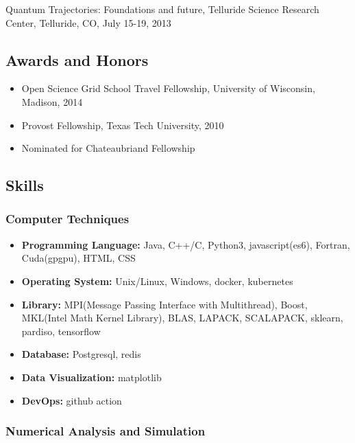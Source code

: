 \documentclass[
]{article}
\providecommand{\tightlist}{%
  \setlength{\itemsep}{0pt}\setlength{\parskip}{0pt}}
\begin{document}
Quantum Trajectories: Foundations and future, Telluride Science Research
Center, Telluride, CO, July 15-19, 2013

\hypertarget{awards-and-honors}{%
\subsection{Awards and Honors}\label{awards-and-honors}}

\begin{itemize}
\tightlist
\item
  Open Science Grid School Travel Fellowship, University of Wisconsin,
  Madison, 2014
\item
  Provost Fellowship, Texas Tech University, 2010
\item
  Nominated for Chateaubriand Fellowship
\end{itemize}

\hypertarget{skills}{%
\subsection{Skills}\label{skills}}

\hypertarget{computer-techniques}{%
\subsubsection{Computer Techniques}\label{computer-techniques}}

\begin{itemize}
\tightlist
\item
  \textbf{Programming Language:} Java, C++/C, Python3, javascript(es6),
  Fortran, Cuda(gpgpu), HTML, CSS
\item
  \textbf{Operating System:} Unix/Linux, Windows, docker, kubernetes
\item
  \textbf{Library:} MPI(Message Passing Interface with Multithread),
  Boost, MKL(Intel Math Kernel Library), BLAS, LAPACK, SCALAPACK,
  sklearn, pardiso, tensorflow
\item
  \textbf{Database:} Postgresql, redis
\item
  \textbf{Data Visualization:} matplotlib
\item
  \textbf{DevOps:} github action
\end{itemize}

\hypertarget{numerical-analysis-and-simulation}{%
\subsubsection{Numerical Analysis and
Simulation}\label{numerical-analysis-and-simulation}}
\end{document}
